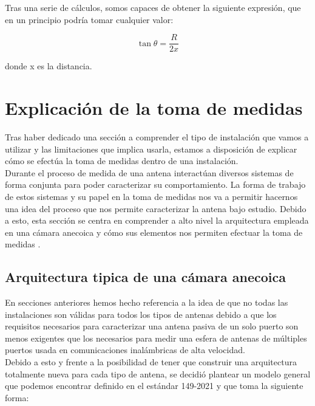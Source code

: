 Tras una serie de cálculos, somos capaces de obtener la siguiente expresión, que en un principio podría tomar cualquier valor: 

                        \begin{equation}
                        \tan\theta =\frac{R}{2x}
                        \end{equation}

\noindent
donde x es la distancia. 

\newpage

\section{Explicación de la toma de medidas}

Tras haber dedicado una sección a comprender el tipo de instalación que vamos a utilizar y las limitaciones que implica usarla, estamos a disposición de explicar cómo se efectúa la toma de medidas dentro de una instalación.\\

Durante el proceso de medida de una antena interactúan diversos sistemas de forma conjunta para poder caracterizar su comportamiento. La forma de trabajo de estos sistemas y su papel en la toma de medidas nos va a permitir hacernos una idea del proceso que nos permite caracterizar la antena bajo estudio. Debido a esto, esta sección se centra en comprender a alto nivel la arquitectura empleada en una cámara anecoica y cómo sus elementos nos permiten efectuar la toma de medidas .

\subsection{Arquitectura tipica de una cámara anecoica} 

En secciones anteriores hemos hecho referencia a la idea de que no todas las instalaciones son válidas para todos los tipos de antenas debido a que los requisitos necesarios para caracterizar una antena pasiva de un solo puerto son menos exigentes que los necesarios para medir una esfera de antenas de múltiples puertos usada en comunicaciones inalámbricas de alta velocidad. 
\\

Debido a esto y frente a la posibilidad de tener que construir una arquitectura totalmente nueva para cada tipo de antena, se decidió plantear un modelo general que podemos encontrar definido en el estándar 149-2021 \autocite{IEEEstd} y que toma la siguiente forma:

